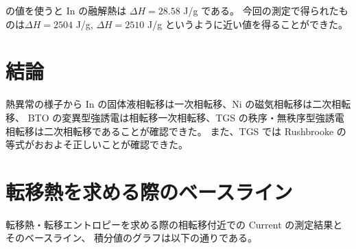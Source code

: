\documentclass[9pt,dvipdfmx,a4paper]{jsarticle}
\begin{document}
\cite{chem} の値を使うと In の融解熱は \(\Delta H = 28.58\) J/g である。
今回の測定で得られたものは\(\Delta H = 2504\) J/g, \(\Delta H = 2510\) J/g
というように近い値を得ることができた。

\section{結論}
熱異常の様子から In の固体液相転移は一次相転移、Ni の磁気相転移は二次相転移、
BTO の変異型強誘電は相転移一次相転移、TGS の秩序・無秩序型強誘電相転移は二次相転移であることが確認できた。
また、TGS では Rushbrooke の等式がおおよそ正しいことが確認できた。



\nocite{*}
\appendix
\section{転移熱を求める際のベースライン}
転移熱・転移エントロピーを求める際の相転移付近での Current の測定結果とそのベースライン、
積分値のグラフは以下の通りである。
\end{document}
